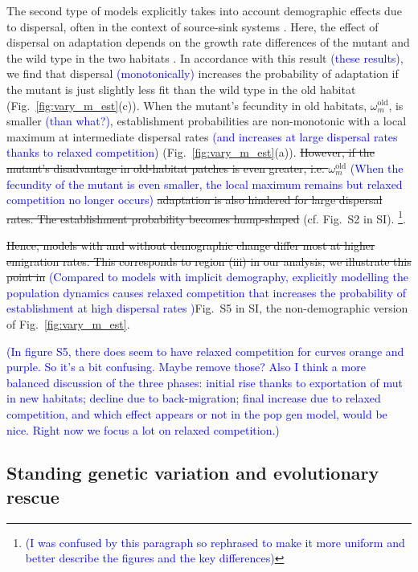 \documentclass[11pt]{article}
\newcommand{\francois}[1]{\textcolor{blue}{(#1)}}
\newcommand{\chg}[1]{\textcolor{change}{#1}}
\begin{document}
The second type of models explicitly takes into account demographic effects due to dispersal, often in the context of source-sink systems \citep{holt_1985,pulliam_1988}. 
Here, the effect of dispersal on adaptation depends on the growth rate differences of the mutant and the wild type in the two habitats \citep{kawecki_2000}. 
In accordance with this result \francois{these results}, we find that dispersal \francois{monotonically} increases the probability of adaptation if the mutant is just slightly less fit than the wild type in the old habitat %
(Fig.~\ref{fig:vary_m_est}(c)). 
When the mutant's fecundity in old habitats, $\omega^\text{old}_m$, is smaller \francois{than what?}, establishment probabilities are non-monotonic with a local maximum at intermediate dispersal rates \francois{and increases at large dispersal rates thanks to relaxed competition} (Fig.~\ref{fig:vary_m_est}(a)). 
\st{However, if the mutant's disadvantage in old-habitat patches is even greater, i.e. $\omega^\text{old}_m$} \francois{When the fecundity of the mutant is even smaller, the local maximum remains but relaxed competition no longer occurs} \st{adaptation is also hindered for large dispersal rates. The establishment probability becomes hump-shaped } (cf. Fig.~S2 in SI). \footnote{\francois{I was confused by this paragraph so rephrased to make it more uniform and better describe the figures and the key differences}}.

\st{Hence, models with and without demographic change differ most at higher emigration rates. This corresponds to region (iii) in our analysis; we illustrate this point in} \francois{Compared to models with implicit demography, explicitly modelling the population dynamics causes relaxed competition that increases the probability of establishment at high dispersal rates }Fig.~S5 in SI, the non-demographic version of Fig.~\ref{fig:vary_m_est}. 

\francois{In figure S5, there does seem to have relaxed competition for curves orange and purple. So it's a bit confusing. Maybe remove those? Also I think a more balanced discussion of the three phases: initial rise thanks to exportation of mut in new habitats; decline due to back-migration; final increase due to relaxed competition, and which effect appears or not in the pop gen model, would be nice. Right now we focus a lot on relaxed competition.}


\subsection*{\chg{Standing genetic variation} and evolutionary rescue}
\end{document}

